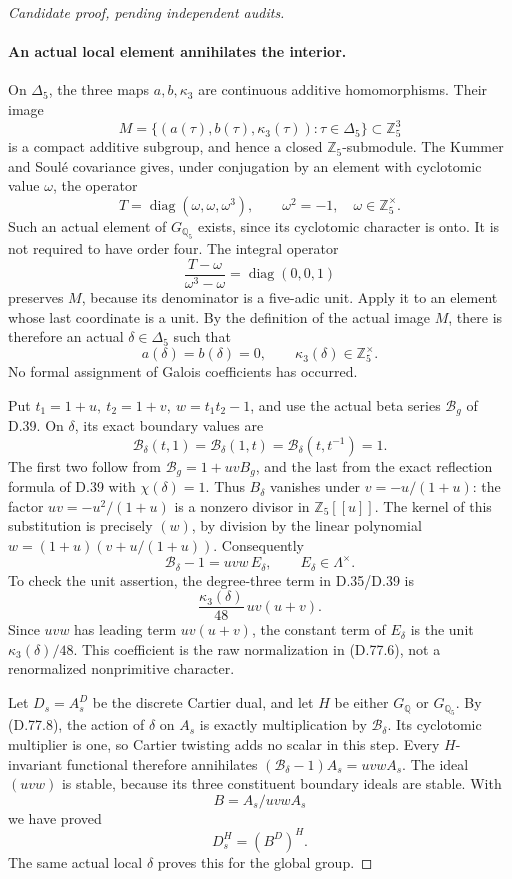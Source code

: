 \begin{proof}[Candidate proof, pending independent audits]
\paragraph{An actual local element annihilates the interior.}
On \(\Delta_5\), the three maps \(a,b,\kappa_3\) are continuous
additive homomorphisms. Their image
\[
 M=\{(a(\tau),b(\tau),\kappa_3(\tau)):\tau\in\Delta_5\}
       \subset\mathbb Z_5^3
\]
is a compact additive subgroup, and hence a closed
\(\mathbb Z_5\)-submodule. The Kummer and Soul\'e covariance gives,
under conjugation by an element with cyclotomic value \(\omega\),
the operator
\[
 T=\operatorname{diag}(\omega,\omega,\omega^3),
 \qquad \omega^2=-1,\quad\omega\in\mathbb Z_5^\times.
\]
Such an actual element of \(G_{\mathbb Q_5}\) exists, since its
cyclotomic character is onto. It is not required to have order four.
The integral operator
\[
 \frac{T-\omega}{\omega^3-\omega}
             =\operatorname{diag}(0,0,1)                \tag{D.77.7}
\]
preserves \(M\), because its denominator is a five-adic unit.
Apply it to an element whose last coordinate is a unit.
By the definition of the actual image \(M\), there is therefore
an actual \(\delta\in\Delta_5\) such that
\[
 a(\delta)=b(\delta)=0,\qquad \kappa_3(\delta)\in\mathbb Z_5^\times .
                                                               \tag{D.77.8}
\]
No formal assignment of Galois coefficients has occurred.

Put \(t_1=1+u,\ t_2=1+v,\ w=t_1t_2-1\), and use the actual beta
series \(\mathcal B_g\) of D.39. On \(\delta\), its exact boundary
values are
\[
 \mathcal B_\delta(t,1)=\mathcal B_\delta(1,t)
          =\mathcal B_\delta(t,t^{-1})=1.
\]
The first two follow from \(\mathcal B_g=1+uvB_g\), and the last
from the exact reflection formula of D.39 with \(\chi(\delta)=1\).
Thus \(B_\delta\) vanishes under \(v=-u/(1+u)\): the factor
\(uv=-u^2/(1+u)\) is a nonzero divisor in \(\mathbb Z_5[[u]]\).
The kernel of this substitution is precisely \((w)\), by division
by the linear polynomial
\(w=(1+u)(v+u/(1+u))\). Consequently
\[
 \mathcal B_\delta-1=uvw\,E_\delta,\qquad
                E_\delta\in\Lambda^\times.             \tag{D.77.9}
\]
To check the unit assertion, the degree-three term in D.35/D.39 is
\[
 \frac{\kappa_3(\delta)}{48}\,uv(u+v).
 \]
Since \(uvw\) has leading term \(uv(u+v)\), the constant term of
\(E_\delta\) is the unit \(\kappa_3(\delta)/48\).
This coefficient is the raw normalization in (D.77.6), not a
renormalized nonprimitive character.

Let \(D_s=A_s^D\) be the discrete Cartier dual, and let
\(H\) be either \(G_{\mathbb Q}\) or \(G_{\mathbb Q_5}\).
By (D.77.8), the action of \(\delta\) on \(A_s\) is exactly
multiplication by \(\mathcal B_\delta\). Its cyclotomic multiplier
is one, so Cartier twisting adds no scalar in this step.
Every \(H\)-invariant functional therefore annihilates
\((\mathcal B_\delta-1)A_s=uvwA_s\). The ideal \((uvw)\)
is stable, because its three constituent boundary ideals are stable.
With
\[
                         B=A_s/uvwA_s
\]
we have proved
\[
                         D_s^H=(B^D)^H.                \tag{D.77.10}
\]
The same actual local \(\delta\) proves this for the global group.


\end{proof}
